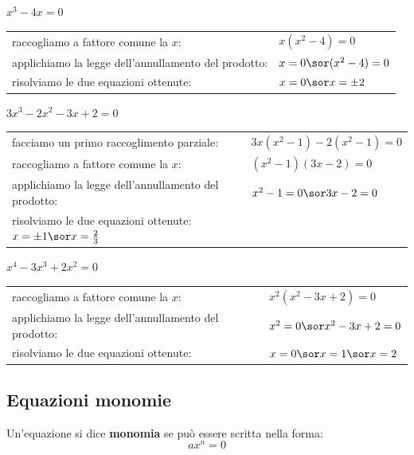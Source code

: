 \begin{esempio}
$x^3-4x=0$
\begin{center}
\begin{tabular}{ll}
raccogliamo a fattore comune la $x$: & $x(x^2-4)=0$\\
applichiamo la legge dell'annullamento del prodotto: & $x=0 \sor (x^2-4)=0$\\
risolviamo le due equazioni ottenute: & $x=0 \sor x=\pm 2$
\end{tabular}
\end{center}
\end{esempio}

\begin{esempio}
$3x^3-2x^2-3x+2=0$
\begin{center}
\begin{tabular}{ll}
facciamo un primo raccoglimento parziale: & $3x(x^2-1)-2(x^2-1)=0$\\
raccogliamo a fattore comune la $x$: & $(x^2-1)(3x-2)=0$\\
applichiamo la legge dell'annullamento del prodotto: & $x^2-1=0 \sor 3x-2=0$\\
risolviamo le due equazioni ottenute: $x=\pm 1\sor x=\frac{2}{3}$& 
\end{tabular}
\end{center}
\end{esempio}

\begin{esempio}
$x^4-3x^3+2x^2=0$
\begin{center}
\begin{tabular}{ll}
raccogliamo a fattore comune la $x$: & $x^2(x^2-3x+2)=0$\\
applichiamo la legge dell'annullamento del prodotto: & $x^2=0 \sor x^2-3x+2=0$\\
risolviamo le due equazioni ottenute: & $x=0 \sor x=1 \sor x=2$
\end{tabular}
\end{center}
\end{esempio}

\subsection{Equazioni monomie}

\begin{definizione}
Un'equazione si dice \textbf{monomia} se può essere scritta nella forma:
$$ax^n=0$$      
\end{definizione}

